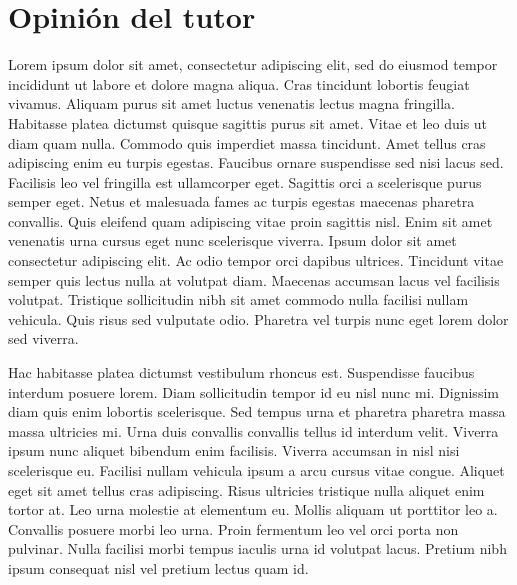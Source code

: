 \section*{Opinión del tutor}
Lorem ipsum dolor sit amet, consectetur adipiscing elit, sed do eiusmod tempor incididunt ut labore et dolore magna aliqua. Cras tincidunt lobortis feugiat vivamus. Aliquam purus sit amet luctus venenatis lectus magna fringilla. Habitasse platea dictumst quisque sagittis purus sit amet. Vitae et leo duis ut diam quam nulla. Commodo quis imperdiet massa tincidunt. Amet tellus cras adipiscing enim eu turpis egestas. Faucibus ornare suspendisse sed nisi lacus sed. Facilisis leo vel fringilla est ullamcorper eget. Sagittis orci a scelerisque purus semper eget. Netus et malesuada fames ac turpis egestas maecenas pharetra convallis. Quis eleifend quam adipiscing vitae proin sagittis nisl. Enim sit amet venenatis urna cursus eget nunc scelerisque viverra. Ipsum dolor sit amet consectetur adipiscing elit. Ac odio tempor orci dapibus ultrices. Tincidunt vitae semper quis lectus nulla at volutpat diam. Maecenas accumsan lacus vel facilisis volutpat. Tristique sollicitudin nibh sit amet commodo nulla facilisi nullam vehicula. Quis risus sed vulputate odio. Pharetra vel turpis nunc eget lorem dolor sed viverra.

Hac habitasse platea dictumst vestibulum rhoncus est. Suspendisse faucibus interdum posuere lorem. Diam sollicitudin tempor id eu nisl nunc mi. Dignissim diam quis enim lobortis scelerisque. Sed tempus urna et pharetra pharetra massa massa ultricies mi. Urna duis convallis convallis tellus id interdum velit. Viverra ipsum nunc aliquet bibendum enim facilisis. Viverra accumsan in nisl nisi scelerisque eu. Facilisi nullam vehicula ipsum a arcu cursus vitae congue. Aliquet eget sit amet tellus cras adipiscing. Risus ultricies tristique nulla aliquet enim tortor at. Leo urna molestie at elementum eu. Mollis aliquam ut porttitor leo a. Convallis posuere morbi leo urna. Proin fermentum leo vel orci porta non pulvinar. Nulla facilisi morbi tempus iaculis urna id volutpat lacus. Pretium nibh ipsum consequat nisl vel pretium lectus quam id.